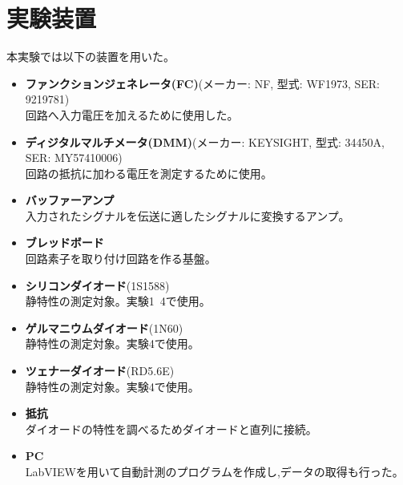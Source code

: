 \section{実験装置}
本実験では以下の装置を用いた。
\begin{itemize}
  \item \textbf{ファンクションジェネレータ(FC)}(メーカー: NF, 型式: WF1973, SER: 9219781)\\
  回路へ入力電圧を加えるために使用した。
  \item \textbf{ディジタルマルチメータ(DMM)}(メーカー: KEYSIGHT, 型式: 34450A, SER: MY57410006)\\
  回路の抵抗に加わる電圧を測定するために使用。
  \item \textbf{バッファーアンプ}\\
  入力されたシグナルを伝送に適したシグナルに変換するアンプ。
  \item \textbf{ブレッドボード}\\
  回路素子を取り付け回路を作る基盤。
  \item \textbf{シリコンダイオード}(1S1588)\\
  静特性の測定対象。実験1~4で使用。 
  \item \textbf{ゲルマニウムダイオード}(1N60)\\
  静特性の測定対象。実験4で使用。
  \item \textbf{ツェナーダイオード}(RD5.6E)\\
  静特性の測定対象。実験4で使用。
  \item \textbf{抵抗}\\
  ダイオードの特性を調べるためダイオードと直列に接続。
  \item \textbf{PC}\\
  LabVIEWを用いて自動計測のプログラムを作成し,データの取得も行った。
\end{itemize}

